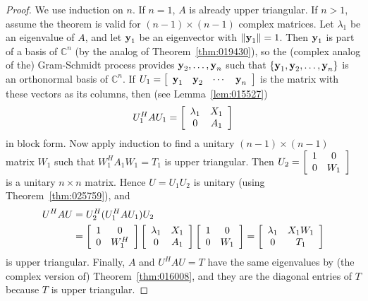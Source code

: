 \begin{proof}
We use induction on $n$. If $n = 1$, $A$ is already upper triangular. If $n > 1$, assume the theorem is valid for $(n - 1) \times (n - 1)$ complex matrices. Let $\lambda_{1}$ be an eigenvalue of $A$, and let $\textbf{y}_{1}$ be an eigenvector with $\|\textbf{y}_{1}\| = 1$. Then $\textbf{y}_{1}$ is part of a basis of $\mathbb{C}^n$ (by the analog of Theorem~\ref{thm:019430}), so the (complex analog of the) Gram-Schmidt process provides $\textbf{y}_{2}, \dots, \textbf{y}_{n}$ such that $\{\textbf{y}_{1}, \textbf{y}_{2}, \dots, \textbf{y}_{n}\}$ is an orthonormal basis of $\mathbb{C}^n$. If $U_{1} = \left[ \begin{array}{cccc}
\textbf{y}_{1} & \textbf{y}_{2} & \cdots & \textbf{y}_{n}
\end{array}\right]$ is the matrix with these vectors as its columns, then (see Lemma~\ref{lem:015527})
\begin{equation*}
U_{1}^HAU_{1} = \left[ \begin{array}{cc}
\lambda_{1} & X_{1} \\
0 & A_{1}
\end{array}\right]
\end{equation*}
in block form. Now apply induction to find a unitary $(n - 1) \times (n - 1)$ matrix $W_{1}$ such that $W_{1}^HA_{1}W_{1} = T_{1}$
 is upper triangular. Then $U_{2} = \left[ \begin{array}{cc}
 1 & 0 \\
 0 & W_{1}
 \end{array}\right]$
 is a unitary $n \times n$ matrix. Hence $U = U_{1}U_{2}$ is unitary (using Theorem~\ref{thm:025759}), and
\begin{align*}
U^HAU &= U_{2}^H(U_{1}^HAU_{1})U_{2} \\
	   &= \left[ \begin{array}{cc}
	   1 & 0 \\
	   0 & W_{1}^H
	   \end{array}\right] \left[ \begin{array}{cc}
   	   \lambda_{1} & X_{1} \\
	   0 & A_{1}
	   \end{array}\right] \left[ \begin{array}{cc}
	   1 & 0 \\
	   0 & W_{1}
	   \end{array}\right] = \left[ \begin{array}{cc}
	   \lambda_{1} & X_{1}W_{1} \\
	   0 & T_{1}
	   \end{array}\right]
\end{align*}
is upper triangular. Finally, $A$ and $U^{H}AU = T$ have the same eigenvalues by (the complex version of) Theorem~\ref{thm:016008}, and they are the diagonal entries of $T$ because $T$ is upper triangular.
\end{proof}

